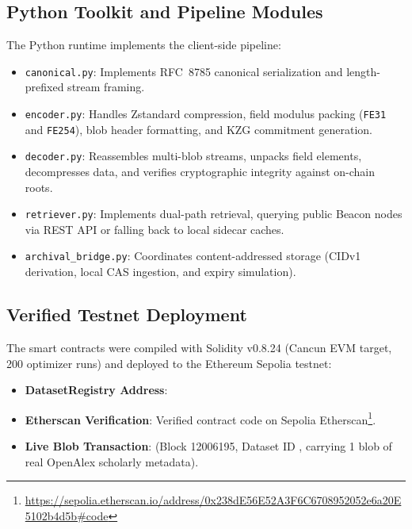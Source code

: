\subsection{Python Toolkit and Pipeline Modules}
The Python runtime implements the client-side pipeline:
\begin{itemize}
    \item \texttt{canonical.py}: Implements RFC~8785 canonical serialization and length-prefixed stream framing.
    \item \texttt{encoder.py}: Handles Zstandard compression, field modulus packing (\texttt{FE31} and \texttt{FE254}), blob header formatting, and KZG commitment generation.
    \item \texttt{decoder.py}: Reassembles multi-blob streams, unpacks field elements, decompresses data, and verifies cryptographic integrity against on-chain roots.
    \item \texttt{retriever.py}: Implements dual-path retrieval, querying public Beacon nodes via REST API or falling back to local sidecar caches.
    \item \texttt{archival\_bridge.py}: Coordinates content-addressed storage (CIDv1 derivation, local CAS ingestion, and expiry simulation).
\end{itemize}

\subsection{Verified Testnet Deployment}
The smart contracts were compiled with Solidity v0.8.24 (Cancun EVM target, 200 optimizer runs) and deployed to the Ethereum Sepolia testnet:
\begin{itemize}
    \item \textbf{DatasetRegistry Address}: 
    \item \textbf{Etherscan Verification}: Verified contract code on Sepolia Etherscan\footnote{\url{https://sepolia.etherscan.io/address/0x238dE56E52A3F6C6708952052e6a20E5102b4d5b\#code}}.
    \item \textbf{Live Blob Transaction}:  (Block 12006195, Dataset ID , carrying 1 blob of real OpenAlex scholarly metadata).
\end{itemize}
